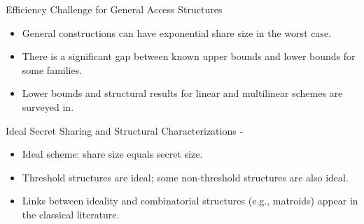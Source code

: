 \begin{frame}{Efficiency Challenge for General Access Structures}
	\begin{itemize}
		\item General constructions can have exponential share size in the worst case.
		\item There is a significant gap between known upper bounds and lower bounds for some families.
		\item Lower bounds and structural results for linear and multilinear schemes are surveyed in.
	\end{itemize}
\end{frame}

\begin{frame}{Ideal Secret Sharing and Structural Characterizations - \cite{brickell1989some}}
	\begin{itemize}
		\item Ideal scheme: share size equals secret size.
		\item Threshold structures are ideal; some non-threshold structures are also ideal.
		\item Links between ideality and combinatorial structures (e.g., matroids) appear in the classical literature.
	\end{itemize}
\end{frame}
